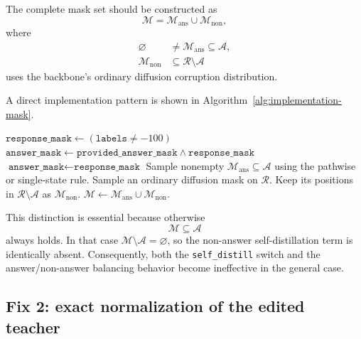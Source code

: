 \documentclass{article}
\newcommand{\Mset}{\mathcal{M}}
\newcommand{\Aset}{\mathcal{A}}
\begin{document}
The complete mask set should be constructed as
\begin{equation}
    \Mset
    =
    \Mset_{\mathrm{ans}}
    \cup
    \Mset_{\mathrm{non}},
\end{equation}
where
\begin{align}
    \varnothing &\neq \Mset_{\mathrm{ans}}\subseteq\Aset,\\
    \Mset_{\mathrm{non}}
    &\subseteq \mathcal{R}\setminus\Aset
\end{align}
uses the backbone's ordinary diffusion corruption distribution.

A direct implementation pattern is shown in
Algorithm~\ref{alg:implementation-mask}.

\begin{algorithm}[t]
\caption{Implementation-safe construction of the TSD mask set}
\label{alg:implementation-mask}
\begin{algorithmic}[1]
    \State $\texttt{response\_mask}\leftarrow(\texttt{labels}\neq -100)$
        \State $\texttt{answer\_mask}\leftarrow
        \texttt{provided\_answer\_mask}\land\texttt{response\_mask}$
    \Else
        \State $\texttt{answer\_mask}\leftarrow\texttt{response\_mask}$
    \EndIf
    \State Sample nonempty $\Mset_{\mathrm{ans}}\subseteq\Aset$ using the
    pathwise or single-state rule.
    \State Sample an ordinary diffusion mask on $\mathcal{R}$.
    \State Keep its positions in $\mathcal{R}\setminus\Aset$ as
    $\Mset_{\mathrm{non}}$.
    \State $\Mset\leftarrow\Mset_{\mathrm{ans}}\cup\Mset_{\mathrm{non}}$.
\end{algorithmic}
\end{algorithm}

This distinction is essential because otherwise
\begin{equation}
    \Mset\subseteq\Aset
\end{equation}
always holds.  In that case
$\Mset\setminus\Aset=\varnothing$, so the non-answer self-distillation term is
identically absent.  Consequently, both the \texttt{self\_distill} switch and
the answer/non-answer balancing behavior become ineffective in the general
case.

\subsection{Fix 2: exact normalization of the edited teacher}
\end{document}
